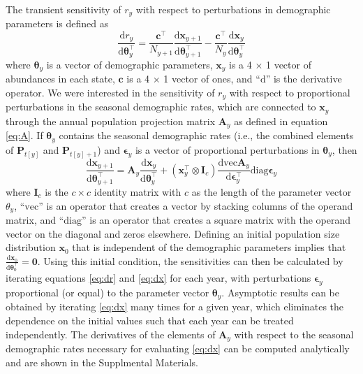 The transient sensitivity of $r_y$ with respect to perturbations in demographic parameters
is defined as
%
\begin{equation} \label{eq:dr}
\frac{\text{d}r_y}{\text{d}\boldsymbol\theta_y^\top} = 
    \frac{\mathbf{c}^\top}{N_{y+1}} \frac{\text{d}\mathbf{x}_{y+1}}
            {\text{d}\boldsymbol\theta_{y+1}^\top}-
        \frac{\mathbf{c}^\top}{N_{y}} \frac{\text{d}\mathbf{x}_y}
            {\text{d}\boldsymbol\theta_y^\top}
\end{equation}
%
where $\boldsymbol\theta_y$ is a vector of demographic parameters, 
$\mathbf{x}_y$ is a 4 $\times$ 1 vector of abundances in each state,
$\mathbf{c}$ is a 4 $\times$ 1 vector of ones,
and ``$\text{d}$'' is the derivative operator.
We were interested in the sensitivity of $r_y$ with respect to proportional 
perturbations in the seasonal demographic rates,
which are connected to $\mathbf{x}_y$ through the annual population projection matrix
$\mathbf{A}_y$ as defined in equation \ref{eq:A}.
If $\boldsymbol\theta_y$ contains the seasonal demographic rates 
(i.e., the combined elements of $\mathbf{P}_{t[y]}$ and $\mathbf{P}_{t[y]+1}$)
and $\boldsymbol\epsilon_y$ is a vector of proportional perturbations in
$\boldsymbol\theta_y$,
then 
%
\begin{equation} \label{eq:dx}
\frac{\text{d}\mathbf{x}_{y+1}}{\text{d}\boldsymbol\theta_{y+1}^\top} = 
    \mathbf{A}_y \frac{\text{d}\mathbf{x}_{y}}{\text{d}\boldsymbol\theta_y^\top}+
        \left(\mathbf{x}_{y}^\top \otimes \mathbf{I}_c \right)
            \frac{\text{dvec}\mathbf{A}_y}{\text{d}\boldsymbol\epsilon_y^\top}
                \text{diag}\boldsymbol\epsilon_y
\end{equation}
%
where $\mathbf{I}_c$ is the $c \times c$ identity matrix with $c$ as the length
of the parameter vector $\theta_y$,
``$\text{vec}$'' is an operator that creates a vector by stacking columns of the operand matrix,
and ``$\text{diag}$'' is an operator that creates a square matrix with the operand vector on
the diagonal and zeros elsewhere. 
Defining an initial population size distribution $\mathbf{x}_0$ 
that is independent of the demographic parameters implies that 
$\frac{\text{d}\mathbf{x}_0}{\text{d}\boldsymbol\theta_0^\top} = \mathbf{0}$.
Using this initial condition,
the sensitivities can then be calculated by iterating equations \ref{eq:dr} and \ref{eq:dx}
for each year, with perturbations $\boldsymbol\epsilon_y$ proportional (or equal)
to the parameter vector $\boldsymbol\theta_y$.
Asymptotic results can be obtained by iterating \ref{eq:dx} many times for a given year,
which eliminates the dependence on the initial values such that each year can be treated
independently. 
The derivatives of the elements of $\mathbf{A}_y$ with respect to the seasonal
demographic rates necessary for evaluating \ref{eq:dx} can be computed analytically
and are shown in the Supplmental Materials.

